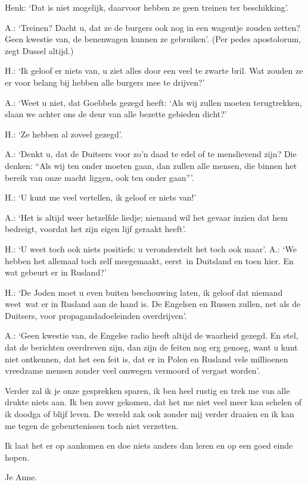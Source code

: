 \documentclass{book}
\begin{document}
Henk: `Dat is niet mogelijk, daarvoor hebben ze geen treinen ter beschikking'.

A.: `Treinen? Dacht u, dat ze de burgers ook nog in een wagentje zouden zetten?
Geen kwestie van, de benenwagen kunnen ze gebruiken'. (Per pedes apostolorum,
zegt Dussel altijd.)

H.: `Ik geloof er niets van, u ziet alles door een veel te zwarte bril.  Wat
zouden ze er voor belang bij hebben alle burgers mee te drijven?'

A.: `Weet u niet, dat Goebbels gezegd heeft: `Als wij zullen moeten
terugtrekken, slaan we achter ons de deur van alle bezette gebieden dicht?'

H.: `Ze hebben al zoveel gezegd'.

A.: `Denkt u, dat de Duitsers voor zo'n daad te edel of te menslievend zijn? Die
denken: ``Als wij ten onder moeten gaan, dan zullen alle mensen, die binnen het
bereik van onze macht liggen, ook ten onder gaan'''.

H.: `U kunt me veel vertellen, ik geloof er niets van!'

A.: `Het is altijd weer hetzelfde liedje; niemand wil het gevaar inzien dat hem
bedreigt, voordat het zijn eigen lijf geraakt heeft'.

H.: `U weet toch ook niets positiefs; u veronderstelt het toch ook maar'. A.:
`We hebben het allemaal toch zelf meegemaakt, eerst~in Duitsland en toen hier.
En wat gebeurt er in Rusland?'

H.: `De Joden moet u even buiten beschouwing laten, ik geloof dat niemand
weet~wat er in Rusland aan de hand is. De Engelsen en Russen zullen, net als de
Duitsers, voor propagandadoeleinden overdrijven'.

A.: `Geen kwestie van, de Engelse radio heeft altijd de waarheid gezegd.  En
stel, dat de berichten overdreven zijn, dan zijn de feiten nog erg genoeg, want
u kunt niet ontkennen, dat het een feit is, dat er in Polen en Rusland vele
millioenen vreedzame mensen zonder veel omwegen vermoord of vergast worden'.

Verder zal ik je onze gesprekken sparen, ik ben heel rustig en trek me van alle
drukte niets aan. Ik ben zover gekomen, dat het me niet veel meer kan schelen of
ik doodga of blijf leven. De wereld zak ook zonder mij verder draaien en ik kan
me tegen de gebeurtenissen toch niet verzetten.

Ik laat het er op aankomen en doe niets anders dan leren en op een goed einde
hopen.

Je Anne.
\end{document}

